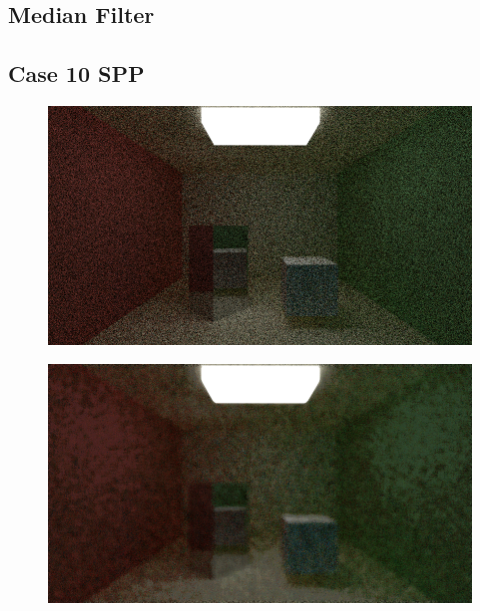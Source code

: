 \documentclass[titlepage,12pt]{report}
\begin{document}
\begin{appendices}
\section{Median Filter}\label{median_filter_appendix}

\subsection{Case 10 SPP}

\begin{figure}[H]
	\centering
  	\includegraphics[scale=0.5]{media/cornell_normal_10.png}
  	\label{ap9}
\end{figure}

\begin{figure}[H]
	\centering
  	\includegraphics[scale=0.5]{media/median/cornell_normal_10_median_filter_11.png}
  	\label{ap10}
\end{figure}


\end{appendices}
\end{document}

